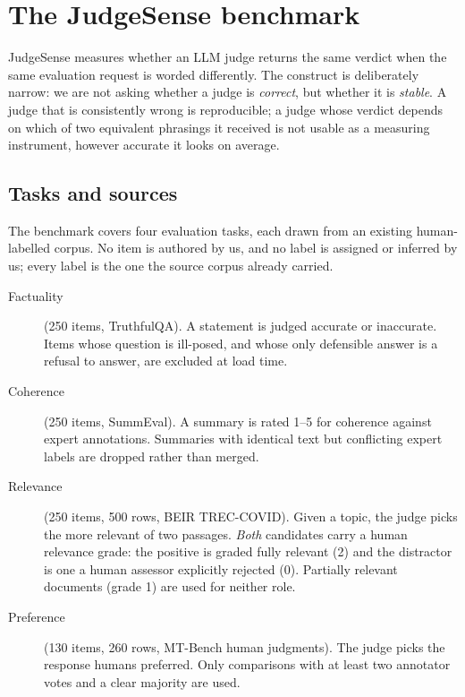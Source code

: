 \section{The JudgeSense benchmark}
\label{sec:benchmark}

JudgeSense measures whether an LLM judge returns the same verdict when the same
evaluation request is worded differently. The construct is deliberately narrow:
we are not asking whether a judge is \emph{correct}, but whether it is
\emph{stable}. A judge that is consistently wrong is reproducible; a judge whose
verdict depends on which of two equivalent phrasings it received is not usable as
a measuring instrument, however accurate it looks on average.

\subsection{Tasks and sources}
\label{sec:sources}

The benchmark covers four evaluation tasks, each drawn from an existing
human-labelled corpus. No item is authored by us, and no label is assigned or
inferred by us; every label is the one the source corpus already carried.

\begin{description}
  \item[Factuality] (250 items, TruthfulQA). A statement is judged accurate or
    inaccurate. Items whose question is ill-posed, and whose only defensible
    answer is a refusal to answer, are excluded at load time.
  \item[Coherence] (250 items, SummEval). A summary is rated 1--5 for
    coherence against expert annotations. Summaries with identical text but
    conflicting expert labels are dropped rather than merged.
  \item[Relevance] (250 items, 500 rows, BEIR TREC-COVID). Given a topic, the
    judge picks the more relevant of two passages. \emph{Both} candidates carry
    a human relevance grade: the positive is graded fully relevant (2) and the
    distractor is one a human assessor explicitly rejected (0). Partially
    relevant documents (grade 1) are used for neither role.
  \item[Preference] (130 items, 260 rows, MT-Bench human judgments). The judge
    picks the response humans preferred. Only comparisons with at least two
    annotator votes and a clear majority are used.
\end{description}

